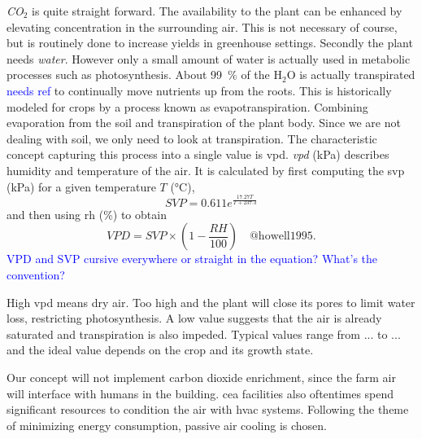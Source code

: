 \textit{CO$_2$} is quite straight forward.
The availability to the plant can be enhanced by elevating concentration in the surrounding air.
This is not necessary of course, but is routinely done to increase yields in greenhouse settings.
Secondly the plant needs \textit{water}.
However only a small amount of water is actually used in metabolic processes such as photosynthesis.
About \SI{99}{\percent} of the H$_2$O is actually transpirated \textcolor{Blue}{needs ref} to continually move nutrients up from the roots.
This is historically modeled for crops by a process known as evapotranspiration.
Combining evaporation from the soil and transpiration of the plant body.
Since we are not dealing with soil, we only need to look at transpiration.
The characteristic concept capturing this process into a single value is \ac{vpd}.
\textit{\ac{vpd}} (\si{\kPa}) describes humidity and temperature of the air.
It is calculated by first computing the \ac{svp} (\si{\kPa}) for a given temperature $T$ (\si{\degreeCelsius}), 
$$
SVP = 0.611 e^{\frac{17.27 T}{T + 237.3}}
$$
and then using \ac{rh} (\si{\percent}) to obtain
$$
VPD = SVP \times (1-\frac{RH}{100}) \quad \text{@howell1995}.
$$
\textcolor{Blue}{VPD and SVP cursive everywhere or straight in the equation? What's the convention?}

High \ac{vpd} means dry air.
Too high and the plant will close its pores to limit water loss, restricting photosynthesis.
A low value suggests that the air is already saturated and transpiration is also impeded.
Typical values range from ... to ... and the ideal value depends on the crop and its growth state.


Our concept will not implement carbon dioxide enrichment, since the farm air will interface with humans in the building.
\ac{cea} facilities also oftentimes spend significant resources to condition the air with \ac{hvac} systems.
Following the theme of minimizing energy consumption, passive air cooling is chosen.

